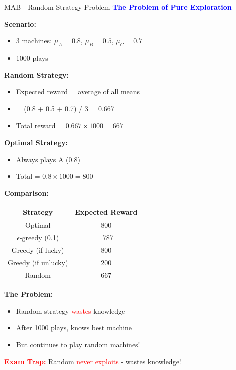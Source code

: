 \documentclass[8pt]{beamer}
\begin{document}
	\begin{frame}{MAB - Random Strategy Problem}
		\fontsize{6.5}{7.5}\selectfont
		\textcolor{blue}{\textbf{The Problem of Pure Exploration}}
		
		\textbf{Scenario:}
		\begin{itemize}
			\item 3 machines: $\mu_A = 0.8$, $\mu_B = 0.5$, $\mu_C = 0.7$
			\item 1000 plays
		\end{itemize}
		
		\textbf{Random Strategy:}
		\begin{itemize}
			\item Expected reward = average of all means
			\item = (0.8 + 0.5 + 0.7) / 3 = 0.667
			\item Total reward = $0.667 \times 1000 = 667$
		\end{itemize}
		
		\textbf{Optimal Strategy:}
		\begin{itemize}
			\item Always plays A (0.8)
			\item Total = $0.8 \times 1000 = 800$
		\end{itemize}
		
		\textbf{Comparison:}
		\begin{tabular}{|c|c|}
			\hline
			Strategy & Expected Reward \\
			\hline
			Optimal & 800 \\
			\hline
			$\epsilon$-greedy (0.1) & ~787 \\
			\hline
			Greedy (if lucky) & 800 \\
			\hline
			Greedy (if unlucky) & 200 \\
			\hline
			Random & 667 \\
			\hline
		\end{tabular}
		
		\textbf{The Problem:}
		\begin{itemize}
			\item Random strategy \textcolor{red}{wastes} knowledge
			\item After 1000 plays, knows best machine
			\item But continues to play random machines!
		\end{itemize}
		
		\textcolor{red}{\textbf{Exam Trap:}} Random \textcolor{red}{never exploits} - wastes knowledge!
	\end{frame}
	
\end{document}
